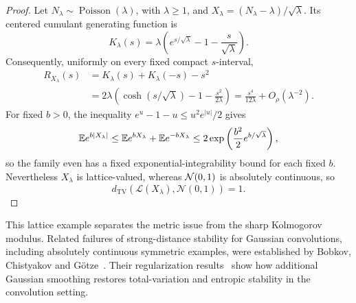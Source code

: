 \begin{proof}
Let $N_\lambda\sim\operatorname{Poisson}(\lambda)$, with $\lambda\ge1$, and $X_\lambda=(N_\lambda-\lambda)/\sqrt\lambda$. Its centered cumulant generating function is
\[
K_\lambda(s)=\lambda\left(e^{s/\sqrt\lambda}-1-\frac{s}{\sqrt\lambda}\right).
\]
Consequently, uniformly on every fixed compact $s$-interval,
\begin{align*}
R_{X_\lambda}(s)
&=K_\lambda(s)+K_\lambda(-s)-s^2\\
&=2\lambda\left(\cosh(s/\sqrt\lambda)-1-\frac{s^2}{2\lambda}\right)
 =\frac{s^4}{12\lambda}+O_\rho(\lambda^{-2}).
\end{align*}
For fixed $b>0$, the inequality $e^u-1-u\le u^2e^{|u|}/2$ gives
\[
\mathbb E e^{b|X_\lambda|}
\le \mathbb E e^{bX_\lambda}+\mathbb E e^{-bX_\lambda}
\le 2\exp\left(\frac{b^2}{2}e^{b/\sqrt\lambda}\right),
\]
so the family even has a fixed exponential-integrability bound for each fixed $b$. Nevertheless $X_\lambda$ is lattice-valued, whereas $\mathcal N(0,1)$ is absolutely continuous, so
\[
d_{\mathrm{TV}}(\mathcal L(X_\lambda),\mathcal N(0,1))=1.
\]
\end{proof}

This lattice example separates the metric issue from the sharp Kolmogorov modulus. Related failures of strong-distance stability for Gaussian convolutions, including absolutely continuous symmetric examples, were established by Bobkov, Chistyakov and G\"otze~\cite{BobkovChistyakovGotze2013}. Their regularization results~\cite{BobkovChistyakovGotze2016} show how additional Gaussian smoothing restores total-variation and entropic stability in the convolution setting.
